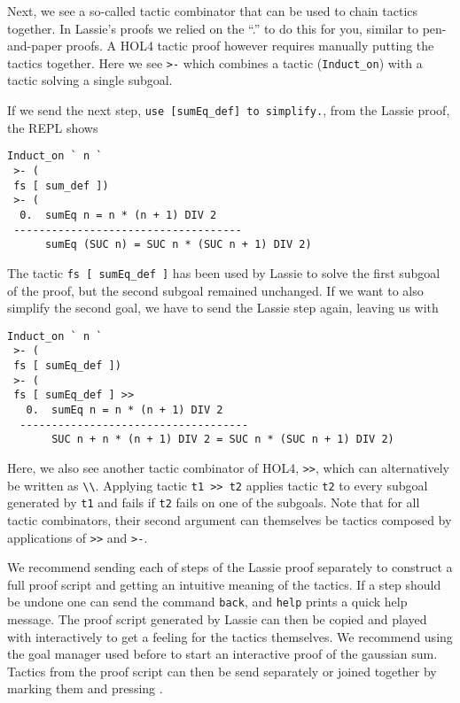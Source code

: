 Next, we see a so-called tactic combinator that can be used to chain tactics
together.
In Lassie's proofs we relied on the ``.'' to do this for you, similar to
pen-and-paper proofs.
A HOL4 tactic proof however requires manually putting the tactics together.
Here we see \lstinline{>-} which combines a tactic (\lstinline{Induct_on})
with a tactic solving a single subgoal.

If we send the next step, \lstinline{use [sumEq_def] to simplify.}, from the Lassie proof, the REPL shows
%
\begin{lstlisting}[frame=single]
Induct_on ` n `
 >- (
 fs [ sum_def ])
 >- (
  0.  sumEq n = n * (n + 1) DIV 2
 ------------------------------------
      sumEq (SUC n) = SUC n * (SUC n + 1) DIV 2)
\end{lstlisting}

The tactic \lstinline{fs [ sumEq_def ]} has been used by Lassie to solve the first subgoal
of the proof, but the second subgoal remained unchanged.
If we want to also simplify the second goal, we have to send the Lassie step again,
leaving us with
%
\begin{lstlisting}[frame=single]
Induct_on ` n `
 >- (
 fs [ sumEq_def ])
 >- (
 fs [ sumEq_def ] >>
   0.  sumEq n = n * (n + 1) DIV 2
  ------------------------------------
       SUC n + n * (n + 1) DIV 2 = SUC n * (SUC n + 1) DIV 2)
\end{lstlisting}

Here, we also see another tactic combinator of HOL4, \lstinline{>>}, which can
alternatively be written as \lstinline{\\}.
Applying tactic \lstinline{t1 >> t2} applies tactic \lstinline{t2} to every
subgoal  generated by \lstinline{t1} and fails if \lstinline{t2} fails on one of
the subgoals.
Note that for all tactic combinators, their second argument can themselves be
tactics composed by applications of \lstinline{>>} and \lstinline{>-}.

We recommend sending each of steps of the Lassie proof separately to construct a
full proof script and getting an intuitive meaning of the tactics.
If a step should be undone one can send the command \lstinline{back}, and
\lstinline{help} prints a quick help message.
The proof script generated by Lassie can then be copied and played with
interactively to get a feeling for the tactics themselves.
We recommend using the goal manager used before to start an interactive proof of
the gaussian sum.
Tactics from the proof script can then be send separately or joined together by
marking them and pressing .